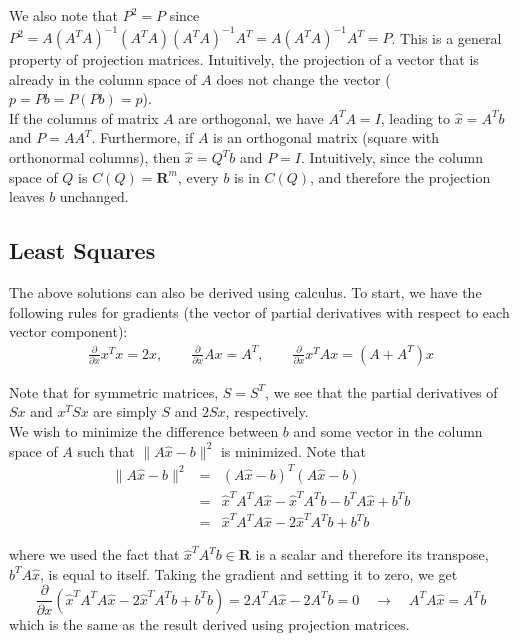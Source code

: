 \documentclass[11pt]{article}
\theoremstyle{plain}
\theoremstyle{definition}
\theoremstyle{remark}
\numberwithin{equation}{section}
\begin{document}
We also note that $P^2 = P$ since $P^2 = A (A^T A)^{-1} (A^T A) (A^T A)^{-1} A^T = A (A^T A)^{-1} A^T = P$. This is a general property of projection matrices. Intuitively, the projection of a vector that is already in the column space of $A$ does not change the vector ($p = Pb = P(Pb) = p$).
\\

If the columns of matrix $A$ are orthogonal, we have $A^T A  = I$, leading to $\hat{x} = A^T b$ and $P = A A^T$. Furthermore, if $A$ is an orthogonal matrix (square with orthonormal columns), then $\hat{x} = Q^T b$ and $P = I$. Intuitively, since the column space of $Q$ is $C(Q) = \mathbf{R}^m$, every $b$ is in $C(Q)$, and therefore the projection leaves $b$ unchanged.


\subsection{Least Squares}
The above solutions can also be derived using calculus. To start, we have the following rules for gradients (the vector of partial derivatives with respect to each vector component):
\[
\boxed{
\begin{aligned}
\ \frac{\partial}{\partial x} x^T x = 2 x, \qquad \frac{\partial}{\partial x} A x = A^T, \qquad \frac{\partial}{\partial x} x^T A x = (A + A^T) x \
\end{aligned}
}
\]

Note that for symmetric matrices, $S = S^T$, we see that the partial derivatives of $S x$ and $x^T S x$ are simply $S$ and $2 S x$, respectively.
\\

We wish to minimize the difference between $b$ and some vector in the column space of $A$ such that $\| A \hat{x} - b \|^2$ is minimized. Note that 
\begin{eqnarray*}
\| A \hat{x} - b \|^2 & = & (A \hat{x} - b)^T (A \hat{x} - b) \\
& = & \hat{x}^T A^T A \hat{x} - \hat{x}^T A^T b - b^T A \hat{x} + b^T b \\
& = & \hat{x}^T A^T A \hat{x} - 2 \hat{x}^T A^T b + b^T b
\end{eqnarray*}

where we used the fact that $\hat{x}^T A^T b \in \mathbf{R}$ is a scalar and therefore its transpose, $b^T A \hat{x}$, is equal to itself. Taking the gradient and setting it to zero, we get
\begin{equation*}
\frac{\partial}{\partial x} \left( \hat{x}^T A^T A \hat{x} - 2 \hat{x}^T A^T b + b^T b \right) = 2 A^T A \hat{x} - 2 A^T b = 0 \quad \rightarrow \quad A^T A \hat{x} = A^T b 
\end{equation*}
which is the same as the result derived using projection matrices.
\end{document}
